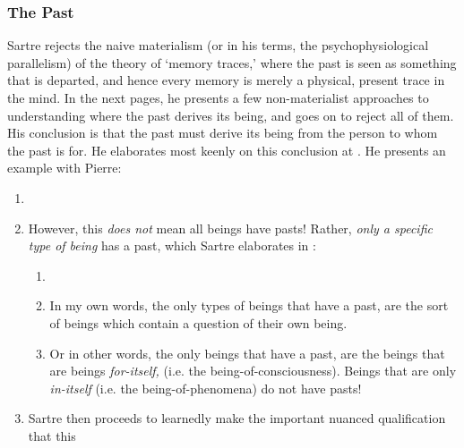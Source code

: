 \subsubsection*{The Past}
Sartre rejects the naive materialism (or in his terms, the psychophysiological parallelism) of the theory of `memory traces,' where the past is seen as something that is departed, and hence every memory is merely a physical, present trace in the mind. In the next pages, he presents a few non-materialist approaches to understanding where the past derives its being, and goes on to reject all of them. His conclusion is that the past must derive its being from the person to whom the past is for. He elaborates most keenly on this conclusion at \autocite[169]{sartre}. He presents an example with Pierre:

\begin{enumerate}
  \item {}
  \item {} However, this \emph{does not} mean all beings have pasts! Rather, \emph{only a specific type of being} has a past, which Sartre elaborates in \autocite[172]{sartre}:
  \begin{enumerate}
    \item {}
    \item In my own words, the only types of beings that have a past, are the sort of beings which contain a question of their own being.
    \item Or in other words, the only beings that have a past, are the beings that are beings \emph{for-itself,} (i.e. the being-of-consciousness). Beings that are only \emph{in-itself} (i.e. the being-of-phenomena) do not have pasts!
  \end{enumerate}
  \item Sartre then proceeds to learnedly make the important nuanced qualification that this 

\end{enumerate}
